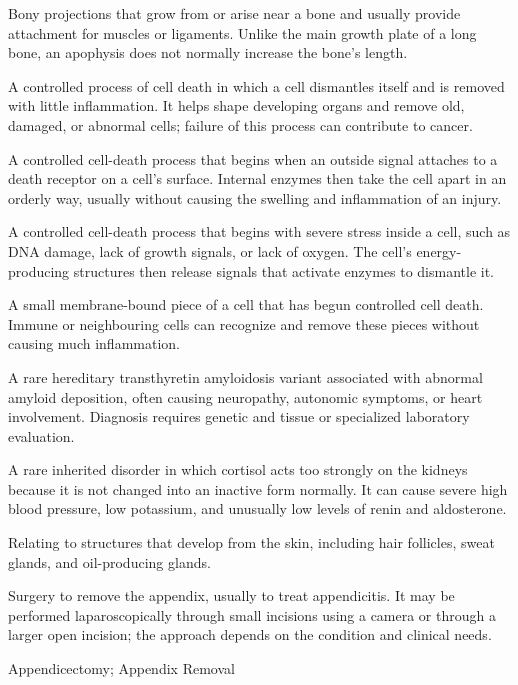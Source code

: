  Bony projections that grow from or arise near a bone and usually provide attachment for muscles or ligaments. Unlike the main growth plate of a long bone, an apophysis does not normally increase the bone’s length.

 A controlled process of cell death in which a cell dismantles itself and is removed with little inflammation. It helps shape developing organs and remove old, damaged, or abnormal cells; failure of this process can contribute to cancer.

 A controlled cell-death process that begins when an outside signal attaches to a death receptor on a cell’s surface. Internal enzymes then take the cell apart in an orderly way, usually without causing the swelling and inflammation of an injury.

 A controlled cell-death process that begins with severe stress inside a cell, such as DNA damage, lack of growth signals, or lack of oxygen. The cell’s energy-producing structures then release signals that activate enzymes to dismantle it.

 A small membrane-bound piece of a cell that has begun controlled cell death. Immune or neighbouring cells can recognize and remove these pieces without causing much inflammation.

 A rare hereditary transthyretin amyloidosis variant associated with abnormal amyloid deposition, often causing neuropathy, autonomic symptoms, or heart involvement. Diagnosis requires genetic and tissue or specialized laboratory evaluation.

 A rare inherited disorder in which cortisol acts too strongly on the kidneys because it is not changed into an inactive form normally. It can cause severe high blood pressure, low potassium, and unusually low levels of renin and aldosterone.

 Relating to structures that develop from the skin, including hair follicles, sweat glands, and oil-producing glands.

 Surgery to remove the appendix, usually to treat appendicitis. It may be performed laparoscopically through small incisions using a camera or through a larger open incision; the approach depends on the condition and clinical needs.

\synonyms
Appendicectomy; Appendix Removal

